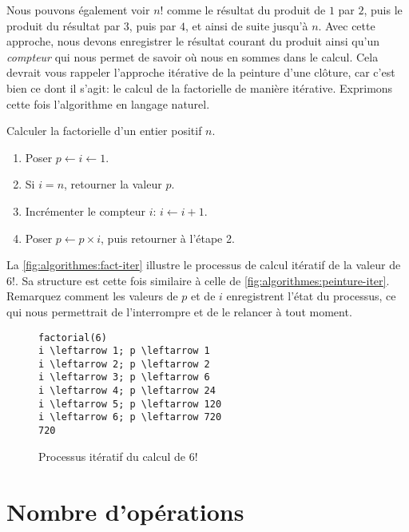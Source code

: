 Nous pouvons également voir $n!$ comme le résultat du produit de $1$
par $2$, puis le produit du résultat par $3$, puis par $4$, et ainsi
de suite jusqu'à $n$. Avec cette approche, nous devons enregistrer le
résultat courant du produit ainsi qu'un
\emph{compteur} qui nous permet de savoir où nous en
sommes dans le calcul. Cela devrait vous rappeler l'approche itérative
de la peinture d'une clôture, car c'est bien ce dont il s'agit: le
calcul de la factorielle de manière itérative.
Exprimons cette fois l'algorithme en langage naturel.

\begin{algorithme}
  \label{algo:algorithmes:factorielle-iterative}
  Calculer la factorielle d'un entier positif $n$.
  \begin{enumerate}
  \item Poser $p \leftarrow i \leftarrow 1$.
  \item Si $i = n$, retourner la valeur $p$.
  \item Incrémenter le compteur $i$: $i \leftarrow i + 1$.
  \item Poser $p \leftarrow p \times i$, puis retourner à l'étape 2.
  \end{enumerate}
\end{algorithme}

La \autoref{fig:algorithmes:fact-iter} illustre le processus de calcul
itératif de la valeur de $6!$. Sa structure est cette fois similaire à
celle de \autoref{fig:algorithmes:peinture-iter}. Remarquez comment
les valeurs de $p$ et de $i$ enregistrent l'état du processus, ce qui
nous permettrait de l'interrompre et de le relancer à tout moment.

\begin{figure}
  \centering
  \begin{minipage}{0.25\linewidth}
\begin{Verbatim}[commandchars=\\\{\}]
factorial(6)
i \leftarrow 1; p \leftarrow 1
i \leftarrow 2; p \leftarrow 2
i \leftarrow 3; p \leftarrow 6
i \leftarrow 4; p \leftarrow 24
i \leftarrow 5; p \leftarrow 120
i \leftarrow 6; p \leftarrow 720
720
\end{Verbatim}
  \end{minipage}
  \caption{Processus itératif du calcul de $6!$}
  \label{fig:algorithmes:fact-iter}
\end{figure}


\section{Nombre d'opérations}
\label{sec:algorithmes:bigO}

